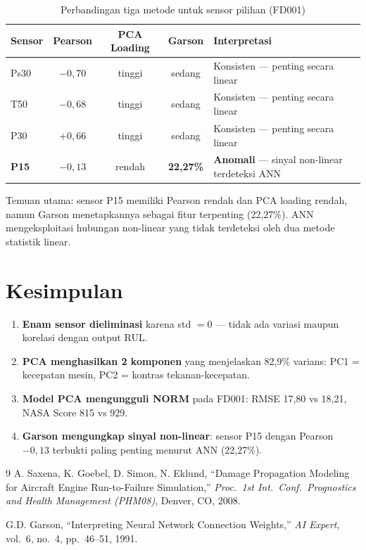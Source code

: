 \documentclass[11pt,a4paper]{article}
\begin{document}
\begin{table}[H]
\centering\small
\caption{Perbandingan tiga metode untuk sensor pilihan (FD001)}
\label{tab:three_method}
\begin{tabular}{lcccp{5cm}}
\toprule
Sensor & Pearson & PCA Loading & Garson & Interpretasi \\
\midrule
Ps30   & $-0{,}70$ & tinggi & sedang & Konsisten --- penting secara linear \\
T50    & $-0{,}68$ & tinggi & sedang & Konsisten --- penting secara linear \\
P30    & $+0{,}66$ & tinggi & sedang & Konsisten --- penting secara linear \\
\textbf{P15}
       & $-0{,}13$ & rendah & \textbf{22,27\%}
  & \textbf{Anomali} --- sinyal non-linear terdeteksi ANN \\
\bottomrule
\end{tabular}
\end{table}

Temuan utama: sensor P15 memiliki Pearson rendah dan PCA loading rendah,
namun Garson menetapkannya sebagai fitur terpenting (22,27\%). ANN
mengeksploitasi hubungan non-linear yang tidak terdeteksi oleh
dua metode statistik linear.

\section{Kesimpulan}

\begin{enumerate}[noitemsep]
  \item \textbf{Enam sensor dieliminasi} karena std $= 0$ ---
    tidak ada variasi maupun korelasi dengan output RUL.

  \item \textbf{PCA menghasilkan 2 komponen} yang menjelaskan 82,9\%
    varians: PC1 = kecepatan mesin, PC2 = kontras tekanan-kecepatan.

  \item \textbf{Model PCA mengungguli NORM} pada FD001:
    RMSE 17,80 vs 18,21, NASA Score 815 vs 929.

  \item \textbf{Garson mengungkap sinyal non-linear}:
    sensor P15 dengan Pearson $-0{,}13$ terbukti paling penting
    menurut ANN (22,27\%).
\end{enumerate}

\begin{thebibliography}{9}
  A. Saxena, K. Goebel, D. Simon, N. Eklund,
  ``Damage Propagation Modeling for Aircraft Engine Run-to-Failure Simulation,''
  \textit{Proc.\ 1st Int.\ Conf.\ Prognostics and Health Management (PHM08)},
  Denver, CO, 2008.

  G.D. Garson,
  ``Interpreting Neural Network Connection Weights,''
  \textit{AI Expert}, vol.~6, no.~4, pp.~46--51, 1991.
\end{thebibliography}
\end{document}
